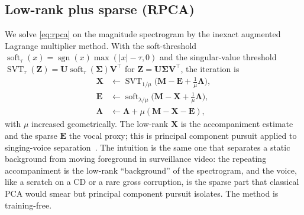 \documentclass{article}
\DeclareMathOperator{\sgn}{sgn}
\DeclareMathOperator{\soft}{soft}
\DeclareMathOperator{\SVT}{SVT}
\newcommand{\M}{\bm{M}}
\newcommand{\X}{\bm{X}}
\newcommand{\Ev}{\bm{E}}
\begin{document}
\subsection{Low-rank plus sparse (RPCA)}
\label{sec:rpca}
We solve \cref{eq:rpca} on the magnitude spectrogram by the inexact augmented
Lagrange multiplier method. With the soft-threshold
$\soft_\tau(x)=\sgn(x)\max(\lvert x\rvert-\tau,0)$ and the singular-value
threshold $\SVT_\tau(\bm Z)=\bm U\soft_\tau(\bm\Sigma)\bm V^\top$ for
$\bm Z=\bm U\bm\Sigma\bm V^\top$, the iteration is
\begin{align}
\X&\leftarrow\SVT_{1/\mu}\!\big(\M-\Ev+\tfrac1\mu\bm\Lambda\big),\\
\Ev&\leftarrow\soft_{\lambda/\mu}\!\big(\M-\X+\tfrac1\mu\bm\Lambda\big),\\
\bm\Lambda&\leftarrow\bm\Lambda+\mu(\M-\X-\Ev),
\end{align}
with $\mu$ increased geometrically. The low-rank $\X$ is the accompaniment estimate
and the sparse $\Ev$ the vocal proxy; this is principal component pursuit applied to
singing-voice separation~\cite{huang2012rpca}. The intuition is the same one that
separates a static background from moving foreground in surveillance video: the
repeating accompaniment is the low-rank ``background'' of the spectrogram, and the
voice, like a scratch on a CD or a rare gross corruption, is the sparse part that
classical PCA would smear but principal component pursuit isolates. The method is
training-free.
\end{document}
